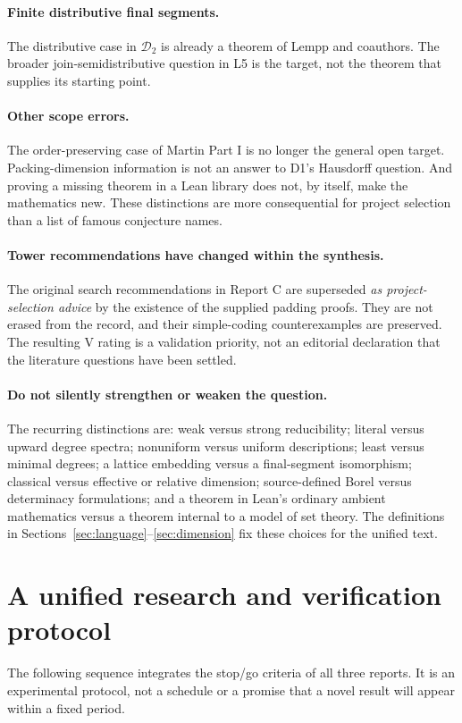 \documentclass[11pt,a4paper]{article}
\newcommand{\D}{\mathcal D}
\theoremstyle{definition}\newtheorem{definition}[theorem]{Definition}
\theoremstyle{remark}\newtheorem{remark}[theorem]{Remark}
\begin{document}
\paragraph{Finite distributive final segments.}
The distributive case in $\D_2$ is already a theorem of Lempp and coauthors. The broader join-semidistributive question in L5 is the target, not the theorem that supplies its starting point.\cite{DCE}

\paragraph{Other scope errors.}
The order-preserving case of Martin Part I is no longer the general open target.\cite{LS} Packing-dimension information is not an answer to D1's Hausdorff question.\cite{SY} And proving a missing theorem in a Lean library does not, by itself, make the mathematics new. These distinctions are more consequential for project selection than a list of famous conjecture names.

\paragraph{Tower recommendations have changed within the synthesis.}
The original search recommendations in Report C are superseded \emph{as project-selection advice} by the existence of the supplied padding proofs. They are not erased from the record, and their simple-coding counterexamples are preserved. The resulting V rating is a validation priority, not an editorial declaration that the literature questions have been settled.

\paragraph{Do not silently strengthen or weaken the question.}
The recurring distinctions are: weak versus strong reducibility; literal versus upward degree spectra; nonuniform versus uniform descriptions; least versus minimal degrees; a lattice embedding versus a final-segment isomorphism; classical versus effective or relative dimension; source-defined Borel versus determinacy formulations; and a theorem in Lean's ordinary ambient mathematics versus a theorem internal to a model of set theory. The definitions in Sections~\ref{sec:language}--\ref{sec:dimension} fix these choices for the unified text.


\section{A unified research and verification protocol}
\label{sec:plan}
The following sequence integrates the stop/go criteria of all three reports. It is an experimental protocol, not a schedule or a promise that a novel result will appear within a fixed period.
\end{document}

